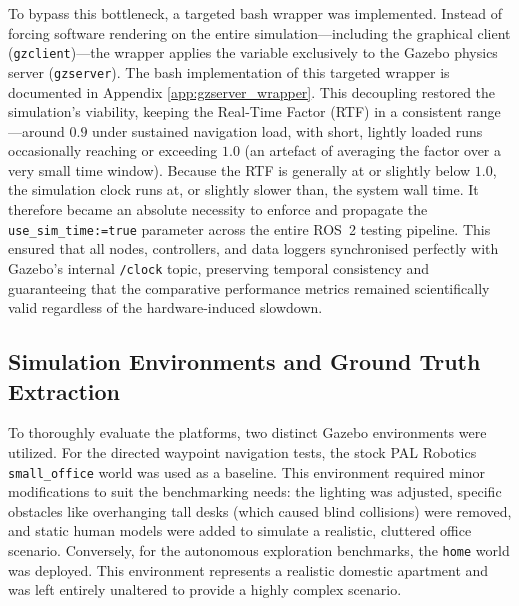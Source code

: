 To bypass this bottleneck, a targeted bash wrapper was implemented. Instead of forcing software rendering on the entire simulation—including the graphical client (\texttt{gzclient})—the wrapper applies the variable exclusively to the Gazebo physics server (\texttt{gzserver}). The bash implementation of this targeted wrapper is documented in Appendix \ref{app:gzserver_wrapper}. This decoupling restored the simulation's viability, keeping the Real-Time Factor (RTF) in a consistent range---around $0.9$ under sustained navigation load, with short, lightly loaded runs occasionally reaching or exceeding $1.0$ (an artefact of averaging the factor over a very small time window). Because the RTF is generally at or slightly below $1.0$, the simulation clock runs at, or slightly slower than, the system wall time. It therefore became an absolute necessity to enforce and propagate the \texttt{use\_sim\_time:=true} parameter across the entire ROS~2 testing pipeline. This ensured that all nodes, controllers, and data loggers synchronised perfectly with Gazebo's internal \texttt{/clock} topic, preserving temporal consistency and guaranteeing that the comparative performance metrics remained scientifically valid regardless of the hardware-induced slowdown.

\subsection{Simulation Environments and Ground Truth Extraction}
\label{subsec:simulation_gt}
To thoroughly evaluate the platforms, two distinct Gazebo environments were utilized. For the directed waypoint navigation tests, the stock PAL Robotics \texttt{small\_office} world was used as a baseline. This environment required minor modifications to suit the benchmarking needs: the lighting was adjusted, specific obstacles like overhanging tall desks (which caused blind collisions) were removed, and static human models were added to simulate a realistic, cluttered office scenario. 
Conversely, for the autonomous exploration benchmarks, the \texttt{home} world was deployed. This environment represents a realistic domestic apartment and was left entirely unaltered to provide a highly complex scenario.

